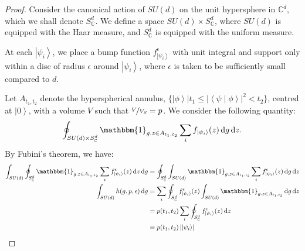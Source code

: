 \documentclass{amsart}
\theoremstyle{definition}
\newcommand{\ket}[1]{{\left\vert{#1}\right\rangle}}
\newcommand{\sprod}[2]{\left|\left< {#1} \middle| {#2} \right>\right|}
\newcommand*\dif{\mathop{}\!\mathrm{d}}
\begin{document}
\begin{proof}
Consider the canonical action of $SU(d)$ on the unit hypersphere in $\mathbb{C}^d$, which we shall denote $S_\mathbb{C}^d$. We define a space $SU(d)\times S_\mathbb{C}^d$, where $SU(d)$ is equipped with the Haar measure, and $S_\mathbb{C}^d$ is equipped with the uniform measure.

At each $\ket{\psi_i}$, we place a bump function $f^\epsilon_\ket{\psi_i}$ with unit integral and support only within a disc of radius $\epsilon$ around $\ket{\psi_i}$, where $\epsilon$ is taken to be sufficiently small compared to $d$.

Let $A_{t_1,t_2}$ denote the hyperspherical annulus, $\{\ket{\phi}|t_1\leq\sprod{\psi}{\phi}^2< t_2\}$, centred at $\ket{0}$, with a volume $V$ such that $\nicefrac{V}{V_S}=p$. We consider the following quantity:
\begin{equation}
\oint_{SU(d)\times S_\mathbb{C}^d} \mathbbm{1}_{g.z\in A_{t_1,t_2}} \sum_i f_\ket{\psi_i}(z) \dif g\dif z.
\end{equation}
By Fubini's theorem, we have:
\begin{align}
\int_{SU(d)} \oint_{S_\mathbb{C}^d} \mathbbm{1}_{g.z\in A_{t_1,t_2}} \sum_i f^\epsilon_\ket{\psi_i}(z) \dif z \dif g &= \oint_{S_\mathbb{C}^d} \int_{SU(d)}  \mathbbm{1}_{g.z\in A_{t_1,t_2}} \sum_i f^\epsilon_\ket{\psi_i}(z) \dif g \dif z \\
\int_{SU(d)} h(g,p,\epsilon) \dif g  &= \sum_i\oint_{S_\mathbb{C}^d}f^\epsilon_\ket{\psi_i}(z)  \int_{SU(d)} \mathbbm{1}_{g.z\in A_{t_1,t_2}} \dif g \dif z \label{eqn:1} \\
 &= p(t_1,t_2)\sum_i\oint_{S_\mathbb{C}^d}f^\epsilon_\ket{\psi_i}(z)  \dif z \label{eqn:2} \\
&= p(t_1,t_2)\left|\ket{\psi_i}\right|
\end{align}




\end{proof}
\end{document}
